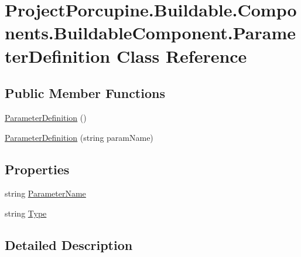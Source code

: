 \hypertarget{class_project_porcupine_1_1_buildable_1_1_components_1_1_buildable_component_1_1_parameter_definition}{}\section{Project\+Porcupine.\+Buildable.\+Components.\+Buildable\+Component.\+Parameter\+Definition Class Reference}
\label{class_project_porcupine_1_1_buildable_1_1_components_1_1_buildable_component_1_1_parameter_definition}
\subsection*{Public Member Functions}
\begin{DoxyCompactItemize}
\item 
\hyperlink{class_project_porcupine_1_1_buildable_1_1_components_1_1_buildable_component_1_1_parameter_definition_a4638b47226636f248ab8dc6fc99088b2}{Parameter\+Definition} ()
\item 
\hyperlink{class_project_porcupine_1_1_buildable_1_1_components_1_1_buildable_component_1_1_parameter_definition_a702ede3744d3e13ed879f10dd3c220f1}{Parameter\+Definition} (string param\+Name)
\end{DoxyCompactItemize}
\subsection*{Properties}
\begin{DoxyCompactItemize}
\item 
string \hyperlink{class_project_porcupine_1_1_buildable_1_1_components_1_1_buildable_component_1_1_parameter_definition_a81da03c6b8f12beb23e5117581cb631a}{Parameter\+Name}
\item 
string \hyperlink{class_project_porcupine_1_1_buildable_1_1_components_1_1_buildable_component_1_1_parameter_definition_af62b9c8adcc97ea39428083b8ddfaad5}{Type}
\end{DoxyCompactItemize}


\subsection{Detailed Description}


